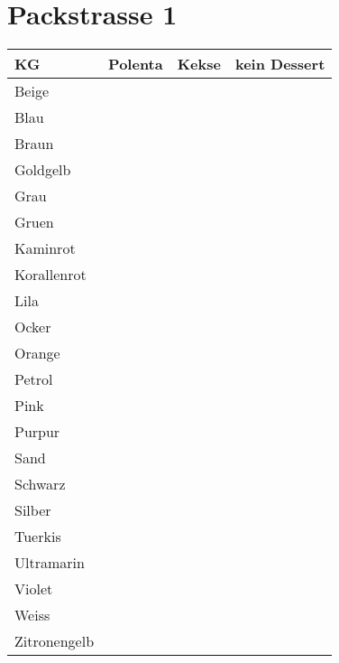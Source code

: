 \documentclass[14pt]{article}
\begin{document}
\centering
\section{Packstrasse 1}
\fontsize{15}{18} \selectfont
\begin{tabular}{l|l|l|l}
  \toprule
  KG  &Polenta&Kekse&kein Dessert\\
  \midrule

Beige&&&\\
\midrule
Blau&&&\\
\midrule

Braun&&&\\
\midrule

Goldgelb&&&\\
\midrule

Grau&&&\\
\midrule

Gruen&&&\\
\midrule

Kaminrot&&&\\
\midrule

Korallenrot&&&\\
\midrule

Lila&&&\\
\midrule

Ocker&&&\\
\midrule

Orange&&&\\
\midrule

Petrol&&&\\
\midrule

Pink&&&\\
\midrule

Purpur&&&\\
\midrule

Sand&&&\\
\midrule

Schwarz&&&\\
\midrule

Silber&&&\\
\midrule

Tuerkis&&&\\
\midrule

Ultramarin&&&\\
\midrule

Violet&&&\\
\midrule

Weiss&&&\\
\midrule

  Zitronengelb&&&\\
  \bottomrule
\end{tabular}
  \newpage
  
\end{document}
